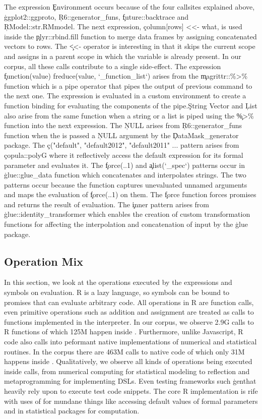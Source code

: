 \documentclass[conference]{IEEEtran}
\begin{document}
The expression \c{Environment} occurs because of the four callsites
explained above, \c{ggplot2::ggproto}, \c{R6::generator_funs},
\c{future::backtrace} and \c{RModel::str.RMmodel}. The next expression,
\c{column[rows] <<- what}, is used inside the \c{plyr::rbind.fill} function
to merge data frames by assigning concatenated vectors to rows. The \c{<<-}
operator is interesting in that it skips the current scope and assigns in a
parent scope in which the variable is already present. In our corpus, all
these \eval calls contribute to a single side-effect. The expression
\c{function(value) freduce(value, `_function_list`)} arises from the
\c{magrittr::\%>\%} function which is a pipe operator that pipes the output
of previous command to the next one. The expression is evaluated in a custom
environment to create a function binding for evaluating the components of
the pipe.\c{String Vector} and \c{List} also arise from the same function
when a string or a list is piped using the \c{\%>\%} function into the next
expression.  The \c{NULL} arises from \c{R6::generator_funs} function when
the \eval is passed a \c{NULL} argument by the \c{DataMask_generator}
package. The \c{c("default", "default2012", "default2011" ...} pattern
arises from \c{copula::polyG} where it reflectively access the default
expression for its formal parameter and evaluates it. The \c{force(..1)} and
\c{alist(`_spec`)} patterns occur in \c{glue::glue_data} function which
concatenates and interpolates strings. The two patterns occur because the
function captures unevaluated unnamed arguments and maps the evaluation of
\c{force(..1)} on them.  The \c{force} function forces promises and returns
the result of evaluation. The \c{inner} pattern arises from
\c{glue::identity_transformer} which enables the creation of custom
transformation functions for affecting the interpolation and concatenation
of input by the \c{glue} package.

\subsection{Operation Mix}
In this section, we look at the operations executed by the expressions and
symbols on evaluation. R is a lazy language, so symbols can be bound to
promises that can evaluate arbitrary code. All operations in R are function
calls, even primitive operations such as addition and assignment are treated
as calls to functions implemented in the interpreter. In our corpus, we
observe 2.9G calls to R functions of which 125M happen inside
\eval. Furthermore, unlike Javascript, R code also calls into peformant
native implementations of numerical and statistical routines. In the corpus
there are 463M calls to native code of which only 31M happens inside \eval.
Qualitatively, we observe all kinds of operations being executed inside
\eval calls, from numerical computing for statistical modeling to reflection
and metaprogramming for implementing DSLs. Even testing frameworks such
\c{genthat} heavily rely upon \eval to execute test code snippets. The core
R implementation is rife with uses of \eval for mundane things like
accessing default values of formal parameters and in statistical packages
for computation.
\end{document}
